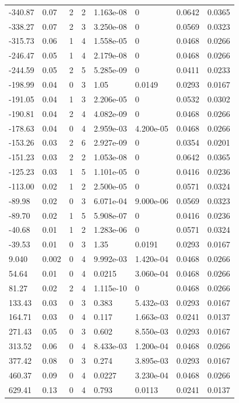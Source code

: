 \documentclass[preview]{standalone}
\begin{document}
{{\begin{tabular}{L{1.2cm}C{1.2cm} C{0.3cm}C{0.5cm} C{1.4cm}C{1.4cm} C{1.4cm}C{1.4cm}}
  -340.87  &  0.07  & 2     &  2 &  1.163e-08  & 0  & 0.0642 &  0.0365   \\ 
  -338.27  &  0.07  & 2     &  3 &  3.250e-08  & 0  & 0.0569 &  0.0323   \\ 
  -315.73  &  0.06  & 1     &  4 &  1.558e-05  & 0  & 0.0468 &  0.0266   \\ 
  -246.47  &  0.05  & 1     &  4 &  2.179e-08  & 0  & 0.0468 &  0.0266   \\ 
  -244.59  &  0.05  & 2     &  5 &  5.285e-09  & 0  & 0.0411 &  0.0233   \\ 
  -198.99  &  0.04  & 0     &  3 &  1.05  & 0.0149  & 0.0293 &  0.0167   \\ 
  -191.05  &  0.04  & 1     &  3 &  2.206e-05  & 0  & 0.0532 &  0.0302   \\ 
  -190.81  &  0.04  & 2     &  4 &  4.082e-09  & 0  & 0.0468 &  0.0266   \\ 
  -178.63  &  0.04  & 0     &  4 &  2.959e-03  & 4.200e-05  & 0.0468 &  0.0266   \\ 
  -153.26  &  0.03  & 2     &  6 &  2.927e-09  & 0  & 0.0354 &  0.0201   \\ 
  -151.23  &  0.03  & 2     &  2 &  1.053e-08  & 0  & 0.0642 &  0.0365   \\ 
  -125.23  &  0.03  & 1     &  5 &  1.101e-05  & 0  & 0.0416 &  0.0236   \\ 
  -113.00  &  0.02  & 1     &  2 &  2.500e-05  & 0  & 0.0571 &  0.0324   \\ 
  -89.98  &  0.02  & 0     &  3 &  6.071e-04  & 9.000e-06  & 0.0569 &  0.0323   \\ 
  -89.70  &  0.02  & 1     &  5 &  5.908e-07  & 0  & 0.0416 &  0.0236   \\ 
  -40.68  &  0.01  & 1     &  2 &  1.283e-06  & 0  & 0.0571 &  0.0324   \\ 
  -39.53  &  0.01  & 0     &  3 &  1.35  & 0.0191  & 0.0293 &  0.0167   \\ 
  9.040  &  0.002  & 0     &  4 &  9.992e-03  & 1.420e-04  & 0.0468 &  0.0266   \\ 
  54.64  &  0.01  & 0     &  4 &  0.0215  & 3.060e-04  & 0.0468 &  0.0266   \\ 
  81.27  &  0.02  & 2     &  4 &  1.115e-10  & 0  & 0.0468 &  0.0266   \\ 
  133.43  &  0.03  & 0     &  3 &  0.383  & 5.432e-03  & 0.0293 &  0.0167   \\ 
  164.71  &  0.03  & 0     &  4 &  0.117  & 1.663e-03  & 0.0241 &  0.0137   \\ 
  271.43  &  0.05  & 0     &  3 &  0.602  & 8.550e-03  & 0.0293 &  0.0167   \\ 
  313.52  &  0.06  & 0     &  4 &  8.433e-03  & 1.200e-04  & 0.0468 &  0.0266   \\ 
  377.42  &  0.08  & 0     &  3 &  0.274  & 3.895e-03  & 0.0293 &  0.0167   \\ 
  460.37  &  0.09  & 0     &  4 &  0.0227  & 3.230e-04  & 0.0468 &  0.0266   \\ 
  629.41  &  0.13  & 0     &  4 &  0.793  & 0.0113  & 0.0241 &  0.0137   \\ 
\hline 
\end{tabular} 

}}
\end{document}
